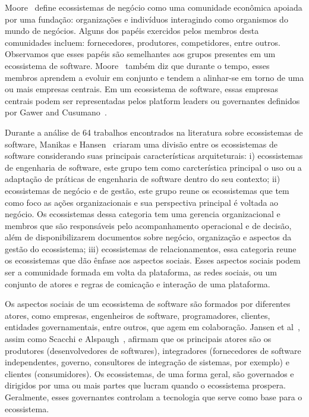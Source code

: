 \documentclass[conference]{IEEEtran}
\begin{document}
Moore~\cite{Moore1996} define ecossistemas de negócio como uma comunidade econômica apoiada por uma fundação: organizações e indivíduos interagindo como organismos do mundo de negócios. Alguns dos papéis exercidos pelos membros desta comunidades incluem: fornecedores, produtores, competidores, entre outros. Observamos que esses papéis são semelhantes aos grupos presentes em um ecossistema de software. Moore~\cite{Moore1996} também diz que durante o tempo, esses membros aprendem a evoluir em conjunto e tendem a alinhar-se em torno de uma ou mais empresas centrais. Em um ecossistema de software, essas empresas centrais podem ser representadas pelos platform leaders ou governantes definidos por Gawer and Cusumano~\cite{Gawer2002}.

Durante a análise de 64 trabalhos encontrados na literatura sobre ecossistemas de software, Manikas e Hansen~\cite{Manikas2013} criaram uma divisão entre os ecossistemas de software considerando suas principais características arquiteturais: i) ecossistemas de engenharia de software, este grupo tem como carcterística principal o uso ou a adaptação de práticas de engenharia de software dentro do seu contexto; ii) ecossistemas de negócio e de gestão, este grupo reune os ecossistemas que tem como foco as ações organizacionais e sua perspectiva principal é voltada ao negócio. Os ecossistemas dessa categoria tem uma gerencia organizacional e membros que são responsáveis pelo acompanhamento operacional e de decisão, além de disponibilizarem documentos sobre negócio, organização e aspectos da gestão do ecossistema; iii) ecossistemas de relacionamentos, essa categoria reune os ecossistemas que dão ênfase aos aspectos sociais. Esses aspectos sociais podem ser a comunidade formada em volta da plataforma, as redes sociais, ou um conjunto de atores e regras de comicação e interação de uma plataforma.

Os aspectos sociais de um ecossistema de software são formados por diferentes atores, como empresas, engenheiros de software, programadores, clientes, entidades governamentais, entre outros, que agem em colaboração. Jansen et al~\cite{Jansen2013}, assim como Scacchi e Alspaugh~\cite{Scacchi2012}, afirmam que os principais atores são os produtores (desenvolvedores de softwares), integradores (fornecedores de software independentes, governo, consultores de integração de sistemas, por exemplo) e clientes (consumidores). Os ecossistemas, de uma forma geral, são governados e dirigidos por uma ou mais partes que lucram quando o ecossistema prospera. Geralmente, esses governantes controlam a tecnologia que serve como base para o ecossistema.
\end{document}
